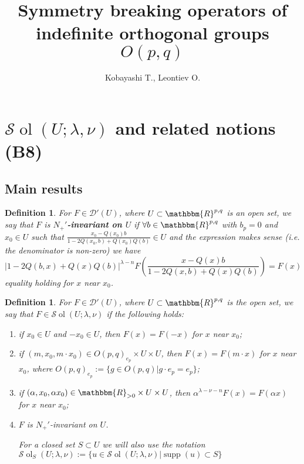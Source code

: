 \documentclass[12pt]{article}
\title{Symmetry breaking operators of indefinite orthogonal groups $O(p,q)$}
\author{Kobayashi T., Leontiev O.}
\newcommand{\assign}{:=}
\newcommand{\tmop}[1]{\ensuremath{\operatorname{#1}}}
\newcommand{\tmtextbf}[1]{{\bfseries{#1}}}
\newtheorem{definition}[proposition]{Definition}
\theoremstyle{remark}
\newcommand{\D}{\mathcal{D}}
\begin{document}
\maketitle


\setcounter{section}{8}
\section{$\mathcal{S} \tmop{ol} (U ; \lambda, \nu)$ and related notions (B8)}\label{sec:sol}


\subsection{Main results}

\begin{definition}
  \label{def-n-nots:def-n+invar}For $F \in \D' (U)$, where $U \subset
  \mathbbm{R}^{p, q}$ is an open set, we say that $F$ is
  \tmtextbf{$N_+'$-invariant on $U$} if $\forall b \in \mathbbm{R}^{p, q}$
  with $b_p = 0$ and $x_0 \in U$ such that $\frac{x_0 - Q (x_0) b}{1 - 2 Q
  (x_0, b) + Q (x_0) Q (b)} \in U$ and the expression makes sense (i.e. the
  denominator is non-zero) we have
  \begin{equation}
    \label{eq-Nequiv} | 1 - 2 Q (b, x) + Q (x) Q (b) |^{\lambda - n} F \left(
    \frac{x - Q (x) b}{1 - 2 Q (x, b) + Q (x) Q (b)} \right) = F (x)
  \end{equation}
  equality holding for $x$ near $x_0$.
\end{definition}

\begin{definition}
  \label{sol:def-sol}For $F \in \D' (U)$, where $U \subset \mathbbm{R}^{p, q}$
  is the open set, we say that $F \in \mathcal{S} \tmop{ol} (U ; \lambda,
  \nu)$ if the following holds:
  \begin{enumerate}
    \item if $x_0 \in U$ and $- x_0 \in U$, then $F (x) = F (- x)$ for $x$
    near $x_0$;
    
    \item if $(m, x_0, m \cdot x_0) \in O (p, q)_{e_p} \times U \times U$,
    then $F (x) = F (m \cdot x)$ for $x$ near $x_0$, where $O (p, q)_{e_p}
    \assign \{g \in O (p, q) |g \cdot e_p = e_p \}$;
    
    \item if $(\alpha, x_0, \alpha x_0) \in \mathbbm{R}_{> 0} \times U \times
    U$, then $\alpha^{\lambda - \nu - n} F (x) = F (\alpha x)$ for $x$ near
    $x_0$;
    
    \item $F$ is $N_+'$-invariant on $U$.{
    
    }{
    
    }For a closed set $S \subset U$ we will also use the notation $\mathcal{S}
    \tmop{ol}_S (U ; \lambda, \nu) \assign \{ u \in \mathcal{S} \tmop{ol} (U ;
    \lambda, \nu) | \tmop{supp} (u) \subset S \}$
  \end{enumerate}
\end{definition}
\end{document}
